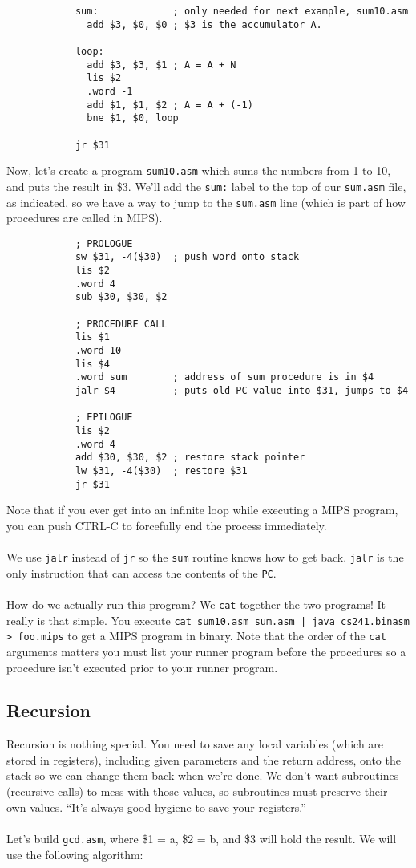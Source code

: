 \documentclass[]{article}
\theoremstyle{definition}
\begin{document}
		\begin{verbatim}
			sum:             ; only needed for next example, sum10.asm
			  add $3, $0, $0 ; $3 is the accumulator A.

			loop:
			  add $3, $3, $1 ; A = A + N
			  lis $2
			  .word -1
			  add $1, $1, $2 ; A = A + (-1)
			  bne $1, $0, loop

			jr $31
		\end{verbatim}

		Now, let's create a program \verb+sum10.asm+ which sums the numbers from 1 to 10, and puts the result in \$3. We'll add the \verb+sum:+ label to the top of our \verb+sum.asm+ file, as indicated, so we have a way to jump to the \verb+sum.asm+ line (which is part of how procedures are called in MIPS).
		
		\begin{verbatim}
			; PROLOGUE
			sw $31, -4($30)  ; push word onto stack
			lis $2
			.word 4
			sub $30, $30, $2
			
			; PROCEDURE CALL
			lis $1
			.word 10
			lis $4
			.word sum        ; address of sum procedure is in $4
			jalr $4          ; puts old PC value into $31, jumps to $4

			; EPILOGUE
			lis $2
			.word 4
			add $30, $30, $2 ; restore stack pointer 
			lw $31, -4($30)  ; restore $31
			jr $31
		\end{verbatim}

		Note that if you ever get into an infinite loop while executing a MIPS program, you can push CTRL-C to forcefully end the process immediately.
		\\ \\
		We use \verb+jalr+ instead of \verb+jr+ so the \verb+sum+ routine knows how to get back. \verb+jalr+ is the only instruction that can access the contents of the \verb+PC+.
		\\ \\
		How do we actually run this program? We \verb+cat+ together the two programs! It really is that simple. You execute \verb+cat sum10.asm sum.asm | java cs241.binasm > foo.mips+ to get a MIPS program in binary. Note that the order of the \verb+cat+ arguments matters \textendash{} you must list your runner program before the procedures so a procedure isn't executed prior to your runner program.

		\subsection{Recursion}
			Recursion is nothing special. You need to save any local variables (which are stored in registers), including given parameters and the return address, onto the stack so we can change them back when we're done. We don't want subroutines (recursive calls) to mess with those values, so subroutines must preserve their own values. ``It's always good hygiene to save your registers.''
			\\ \\
			Let's build \verb+gcd.asm+, where \$1 = a, \$2 = b, and \$3 will hold the result. We will use the following algorithm:
\end{document}
